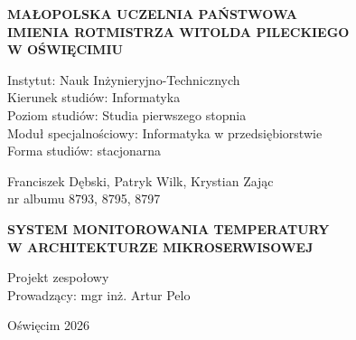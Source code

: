 \thispagestyle{empty}

\begin{center}
    \vspace*{-1cm} %
    
    {\Large\textbf{\selectfont
        MAŁOPOLSKA UCZELNIA PAŃSTWOWA \\
        IMIENIA ROTMISTRZA WITOLDA PILECKIEGO \\
        W OŚWIĘCIMIU} \\[2.5em]} %
        \vspace{0.5cm}
            \begin{flushleft}
                {\normalsize
                \hspace*{3cm} Instytut: Nauk Inżynieryjno-Technicznych \\[1em]
                \hspace*{3cm} Kierunek studiów: Informatyka \\[1em]
                \hspace*{3cm} Poziom studiów: Studia pierwszego stopnia \\[1em]
                \hspace*{3cm} Moduł specjalnościowy: Informatyka w przedsiębiorstwie \\[1em]
                \hspace*{3cm} Forma studiów: stacjonarna \\[1em]}
            \end{flushleft}
        
        \vspace{1cm}
    
    {\normalsize
    Franciszek Dębski, Patryk Wilk, Krystian Zając \\[1em]
    nr albumu 8793, 8795, 8797}
    
    \vspace{1cm}
    
    {\Large\textbf{\selectfont
    SYSTEM MONITOROWANIA TEMPERATURY\\ W ARCHITEKTURZE MIKROSERWISOWEJ}}
    
    \vspace{3cm}
    
    \begin{center}
    {\normalsize
    \hspace*{11,5cm}Projekt zespołowy \\[0.5em]
    \hspace*{9cm}Prowadzący: mgr inż. Artur Pelo \\[0.5em]}
    \end{center}
    
    \vfill
    \vspace{3cm}
   
    {\normalsize
    Oświęcim 2026}
    
\end{center}

\newpage